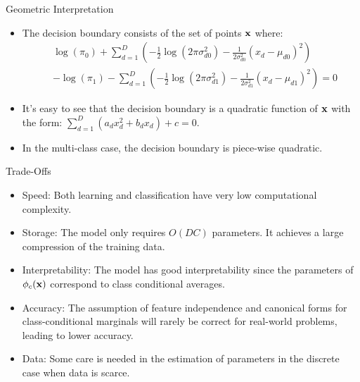 \documentclass[serif,xcolor=pdftex,dvipsnames,table,hyperref={bookmarks=false}]{beamer}
\begin{document}
\begin{frame}[t]{Geometric Interpretation}

\begin{itemize}
\setlength{\itemsep}{12pt}
\item The decision boundary consists of the set of points ${\mathbf{x}}$ where:
\pause
\begin{align*}
&\log(\pi_0) + \sum_{d=1}^D \left(-\frac{1}{2}\log(2\pi\sigma_{d0}^2) - \frac{1}{2\sigma_{d0}^2}(x_d-\mu_{d0})^2\right) \\
&-\log(\pi_1) - \sum_{d=1}^D \left(-\frac{1}{2}\log(2\pi\sigma_{d1}^2) - \frac{1}{2\sigma_{d1}^2}(x_d-\mu_{d1})^2\right)=0
\end{align*}

\pause\item It's easy to see that the decision boundary is a quadratic function of ${\mathbf{x}}$ with the form:
$\sum_{d=1}^D \left( a_dx_d^2 + b_dx_d\right) + c=0$.

\pause\item In the multi-class case, the decision boundary is piece-wise quadratic.

\end{itemize}
\end{frame}

\begin{frame}[t]{Trade-Offs}

\begin{itemize}
\setlength{\itemsep}{12pt}
\item Speed: Both learning and classification have very low computational complexity.

\pause \item Storage: The model only requires $O(DC)$ parameters. It achieves a large compression of the training data.

\pause \item Interpretability: The model has good interpretability since the parameters of $\phi_c({\mathbf{x}})$ correspond to class conditional averages.

\pause \item Accuracy: The assumption of feature independence and canonical forms for class-conditional marginals will rarely be correct for real-world problems, leading to lower accuracy.

\pause \item Data: Some care is needed in the estimation of parameters in the discrete case when data is scarce. 

\end{itemize}
\end{frame}
\end{document}
